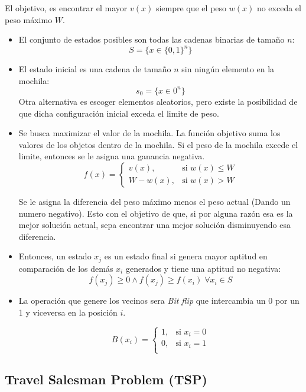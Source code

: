 \documentclass[12pt,twoside]{article}
\begin{document}
	El objetivo, es encontrar el mayor $v(x)$ siempre que el peso $w(x)$ no exceda el peso máximo $W$. 
	
	\begin{itemize}
		\item El conjunto de estados posibles son todas las cadenas binarias de tamaño $n$: \[ S = \{ x \in \{ 0, 1  \}^n \} \]
		
		\item El estado inicial es una cadena de tamaño $n$ sin ningún elemento en la mochila: \[ s_0 = \{x \in {0}^n \} \]
		Otra alternativa es escoger elementos aleatorios, pero existe la posibilidad de que dicha configuración inicial exceda el limite de peso.
		
		\item Se busca maximizar el valor de la mochila. La función objetivo suma los valores de los objetos dentro de la mochila. Si el peso de la mochila excede el limite, entonces se le asigna una ganancia negativa. 
		\[
		f(x) =
		\begin{cases} 
			v(x), & \text{si } w(x) \leq W \\ 
			W - w(x), & \text{si } w(x) > W
		\end{cases}
		\]
		
		Se le asigna la diferencia del peso máximo menos el peso actual (Dando un numero negativo). Esto con el objetivo de que, si por alguna razón esa es la mejor solución actual, sepa encontrar una mejor solución disminuyendo esa diferencia.
		
		\item Entonces, un estado $x_j$ es un estado final si genera mayor aptitud en comparación de los demás $x_i$ generados y tiene una aptitud no negativa: \[ f(x_j) \geq 0 \land f(x_j) \geq f(x_i) \; \forall x_i \in S\]
		
		\item La operación que genere los vecinos sera \textit{Bit flip} que intercambia un 0 por un 1 y viceversa en la posición $i$.
		
		\[
		B(x_i) =
		\begin{cases} 
			1, & \text{si } x_i = 0 \\ 
			0, & \text{si } x_i = 1 \\
		\end{cases}
		\]
		
		
	\end{itemize}
	
	\subsection{Travel Salesman Problem (TSP)}
	
\end{document}
